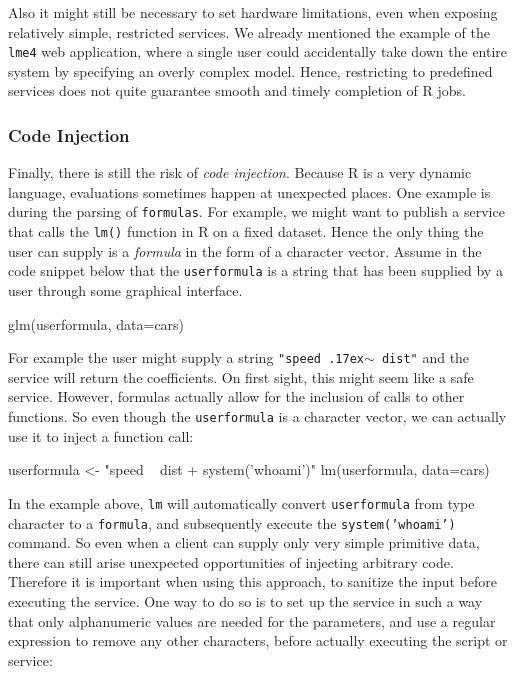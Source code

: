 \documentclass[article]{jss}
\newcommand{\R}{\textsf{R}\xspace}
\begin{document}
Also it might still be necessary to set hardware limitations, even when exposing
relatively simple, restricted services. We already mentioned the example of the
\texttt{lme4} web application, where a single user could accidentally take down
the entire system by specifying an overly complex model. Hence, restricting to
predefined services does not quite guarantee smooth and timely completion of
\R jobs.

\subsubsection{Code Injection}

Finally, there is still the risk of \emph{code injection}. Because \R
is a very dynamic language, evaluations sometimes happen at unexpected places.
One example is during the parsing of \texttt{formulas}. For example, we might
want to publish a service that calls the \texttt{lm()} function in \R
on a fixed dataset. Hence the only thing the user can supply is a \emph{formula}
in the form of a character vector. Assume in the code snippet below that
the \texttt{userformula} is a string that has been supplied by a user through
some graphical interface.

\begin{CodeChunk}
\begin{CodeInput}
glm(userformula, data=cars)
\end{CodeInput}
\end{CodeChunk}

For example the user might supply a string \texttt{"speed
{\raise.17ex\hbox{$\scriptstyle\sim$}} dist"} and the service will return the
coefficients. On first sight, this might seem like a safe service. However,
formulas actually allow for the inclusion of calls to other functions. So even though the \texttt{userformula} is a character vector, we can actually use it to inject a
function call:

\begin{CodeChunk}
\begin{CodeInput}
userformula <- "speed ~ dist + system('whoami')"
lm(userformula, data=cars)
\end{CodeInput}
\end{CodeChunk}

In the example above, \texttt{lm} will automatically convert
\texttt{userformula} from type character to a \texttt{formula}, and
subsequently execute the \texttt{system('whoami')} command. So even when a
client can supply only very simple primitive data, there can still arise
unexpected opportunities of injecting arbitrary code. Therefore it is important
when using this approach, to sanitize the input before executing the service.
One way to do so is to set up the service in such a way that only alphanumeric
values are needed for the parameters, and use a regular expression to remove
any other characters, before actually executing the script or service:
\end{document}
